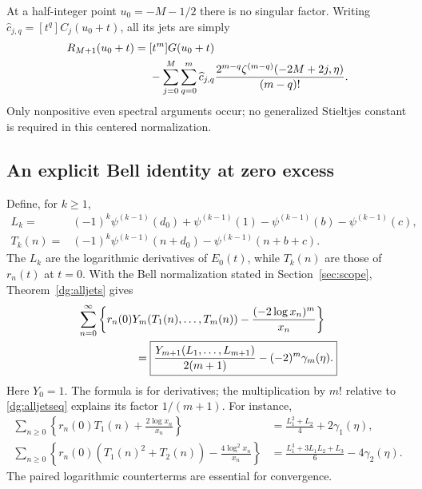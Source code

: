 \documentclass[11pt,a4paper]{article}
\numberwithin{equation}{section}
\theoremstyle{definition}
\theoremstyle{remark}
\begin{document}
At a half-integer point $u_0=-M-1/2$ there is no singular factor.
Writing $\widehat c_{j,q}=[t^q]C_j(u_0+t)$, all its jets are simply
\begin{align}
 [t^m]R_{M+1}(u_0+t)
 ={}&[t^m]G(u_0+t)\notag\\
 &-\sum_{j=0}^{M}\sum_{q=0}^{m}\widehat c_{j,q}
       \frac{2^{m-q}\zeta^{(m-q)}(-2M+2j,\eta)}{(m-q)!}.
 \label{dg:halfjets}
\end{align}
Only nonpositive even spectral arguments occur; no generalized
Stieltjes constant is required in this centered normalization.

\subsection{An explicit Bell identity at zero excess}
Define, for $k\ge1$,
\begin{align}
 L_k={}&(-1)^k\psi^{(k-1)}(d_0)+\psi^{(k-1)}(1)
                    -\psi^{(k-1)}(b)-\psi^{(k-1)}(c),
                    \label{dg:Lk}\\
 T_k(n)={}&(-1)^k\psi^{(k-1)}(n+d_0)
                    -\psi^{(k-1)}(n+b+c).
                    \label{dg:Tk}
\end{align}
The $L_k$ are the logarithmic derivatives of $E_0(t)$, while $T_k(n)$
are those of $r_n(t)$ at $t=0$. With the Bell normalization stated
in Section~\ref{sec:scope}, Theorem~\ref{dg:alljets} gives
\begin{align}
 &\sum_{n=0}^{\infty}\left\{
 r_n(0)Y_m(T_1(n),\ldots,T_m(n))
              -\frac{(-2\log x_n)^m}{x_n}\right\}\notag\\
 &\hspace{18mm}=
 \boxed{\frac{Y_{m+1}(L_1,\ldots,L_{m+1})}{2(m+1)}
              -(-2)^m\gamma_m(\eta).}\label{dg:Bellzero}
\end{align}
Here $Y_0=1$. The formula is for derivatives; the multiplication by
$m!$ relative to \eqref{dg:alljetseq} explains its factor $1/(m+1)$.
For instance,
\begin{align}
 \sum_{n\ge0}\left\{r_n(0)T_1(n)+\frac{2\log x_n}{x_n}\right\}
 &=\frac{L_1^2+L_2}{4}+2\gamma_1(\eta),\label{dg:Bellone}\\
 \sum_{n\ge0}\left\{r_n(0)(T_1(n)^2+T_2(n))
                    -\frac{4\log^2x_n}{x_n}\right\}
 &=\frac{L_1^3+3L_1L_2+L_3}{6}-4\gamma_2(\eta).
 \label{dg:Belltwo}
\end{align}
The paired logarithmic counterterms are essential for convergence.
\end{document}

